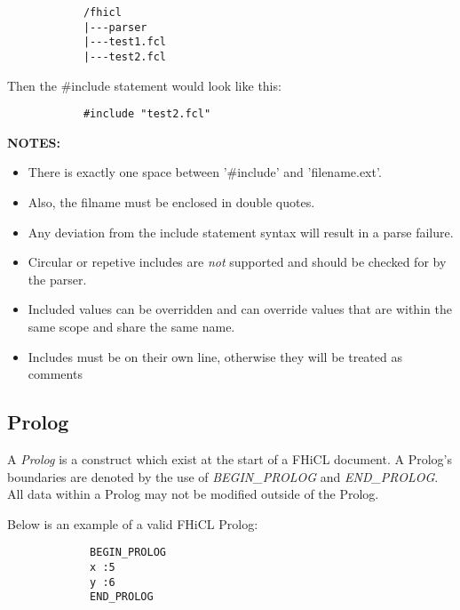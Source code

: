 \documentclass{memarticle}
\begin{document}
{                                \begin{verbatim}
            /fhicl
            |---parser
            |---test1.fcl
            |---test2.fcl
                                \end{verbatim}
                                Then the \#include statement would look like this:
                                \begin{verbatim}
            #include "test2.fcl"
                                \end{verbatim}
                        \textbf{ NOTES: }
                        \begin{itemize}
                           \item There is exactly one space between '\#include' and 'filename.ext'.
                           \item Also, the filname must be enclosed in double quotes.
                           \item Any deviation from the include statement syntax will result in a parse failure.
                           \item Circular or repetive includes are \emph{not} supported
                                 and should be checked for by the parser.
                           \item Included values can be overridden
                                 and can override values that are within the same scope
                                 and share the same name.
                           \item Includes must be on their own line, otherwise they will be treated as comments
                        \end{itemize}
                \subsection{Prolog}
                        A \emph{Prolog} is a construct which exist at the start of a FHiCL document.
                        A Prolog's boundaries are denoted by the use of \emph{BEGIN\_PROLOG} and \emph{END\_PROLOG}.
                        All data within a Prolog may not be modified outside of the Prolog.
                        \par
                        Below is an example of a valid FHiCL Prolog:
                        \begin{verbatim}
             BEGIN_PROLOG
             x :5
             y :6
             END_PROLOG
                        \end{verbatim}
}
\end{document}
